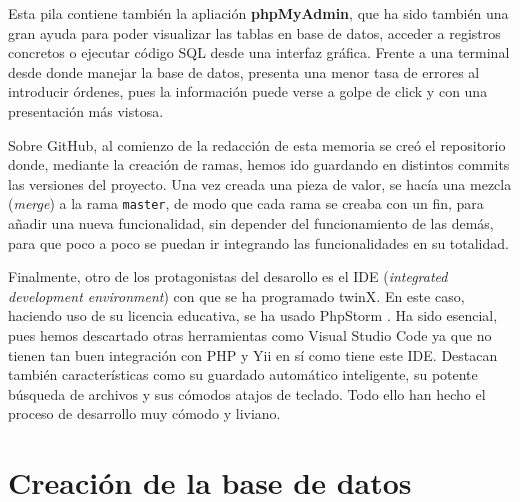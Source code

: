Esta pila contiene también la apliación \textbf{phpMyAdmin}, que ha sido también una gran ayuda para poder visualizar las tablas en base de datos, acceder a registros concretos o ejecutar código SQL desde una interfaz gráfica. Frente a una terminal desde donde manejar la base de datos, presenta una menor tasa de errores al introducir órdenes, pues la información puede verse a golpe de click y con una presentación más vistosa.

Sobre GitHub, al comienzo de la redacción de esta memoria se creó el repositorio \cite{repogit} donde, mediante la creación de ramas, hemos ido guardando en distintos commits las versiones del proyecto. Una vez creada una pieza de valor, se hacía una mezcla (\textit{merge}) a la rama \texttt{master}, de modo que cada rama se creaba con un fin, para añadir una nueva funcionalidad, sin depender del funcionamiento de las demás, para que poco a poco se puedan ir integrando las funcionalidades en su totalidad.

Finalmente, otro de los protagonistas del desarollo es el IDE (\textit{integrated development environment}) con que se ha programado twinX. En este caso, haciendo uso de su licencia educativa, se ha usado PhpStorm \cite{phpstorm}. Ha sido esencial, pues hemos descartado otras herramientas como Visual Studio Code ya que no tienen tan buen integración con PHP y Yii en sí como tiene este IDE. Destacan también características como su guardado automático inteligente, su potente búsqueda de archivos y sus cómodos atajos de teclado. Todo ello han hecho el proceso de desarrollo muy cómodo y liviano.


\section{Creación de la base de datos}



